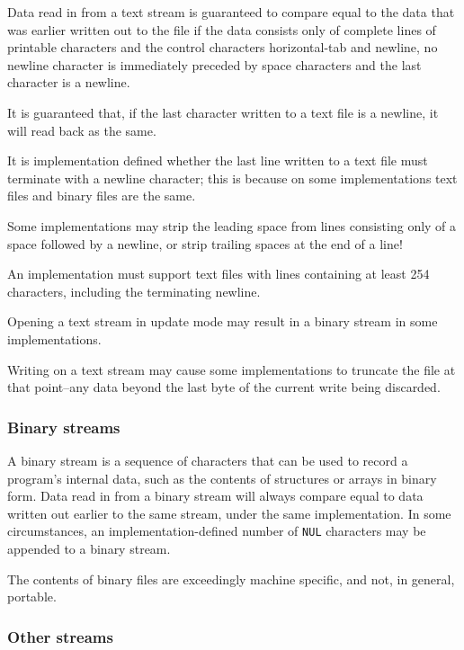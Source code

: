     Data read in from a text stream is guaranteed to compare equal to the
     data that was earlier written out to the file if the data consists only of
     complete lines of printable characters and the control characters
     horizontal-tab and newline, no newline character is immediately preceded
     by space characters and the last character is a newline.


    It is guaranteed that, if the last character written to a text file is
     a newline, it will read back as the same.


    It is implementation defined whether the last line written to a text
     file must terminate with a newline character; this is because on some
     implementations text files and binary files are the same.


    Some implementations may strip the leading space from lines consisting
     only of a space followed by a newline, or strip trailing spaces at the end
     of a line!


    An implementation must support text files with lines containing at least
     254 characters, including the terminating newline.


    Opening a text stream in update mode may result in a binary stream in
     some implementations.


    Writing on a text stream may cause some implementations to truncate the
     file at that point--any data beyond the last byte of the current write
     being discarded.


   

   \subsubsection{Binary streams}
    

    A binary stream is a sequence of characters that can be used to record
     a program's internal data, such as the contents of structures or arrays in
     binary form.  Data read in from a binary stream will always compare equal
     to data written out earlier to the same stream, under the same
     implementation.  In some circumstances, an implementation-defined number
     of \texttt{NUL} characters may be appended to a binary stream.


    The contents of binary files are exceedingly machine specific, and not,
     in general, portable.


   

   \subsubsection{Other streams}
    

